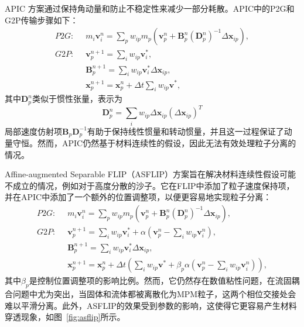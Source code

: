 APIC \cite{jiang2015affine}方案通过保持角动量和防止不稳定性来减少一部分耗散。APIC中的P2G和G2P传输步骤如下：
\begin{equation}
    \begin{aligned}
    P2G: \;\;    
    &m_i\mathbf{v}_i^n =\sum_{p}w_{ip}m_p(\mathbf{v}_p^n + \mathbf{B}_p^n(\mathbf{D}_p^n)^{-1}\Delta\mathbf{x}_{ip}), \\
    G2P:\;\; & \mathbf{v}_p^{n+1}=\sum_iw_{ip}\mathbf{v}_i^*,\\
    &\mathbf{B}_p^{n+1} = \sum_{i}w_{ip}\mathbf{v}_i^*\Delta\mathbf{x}_{ip},\\
    &\mathbf{x}_p^{n+1}=\mathbf{x}_p^n+\Delta t\sum_iw_{ip}\mathbf{v^*},
    \end{aligned}
\end{equation}
其中$\mathbf{D}_p^n$类似于惯性张量，表示为
\begin{equation}
    \mathbf{D}_p^n=\sum_{i}w_{ip}\Delta\mathbf{x}_{ip}(\Delta\mathbf{x}_{ip})^T
\end{equation}
局部速度仿射项$\mathbf{B}_p\mathbf{D}_p^{-1}$有助于保持线性惯量和转动惯量，并且这一过程保证了动量守恒。然而，APIC仍然基于材料连续性的假设，因此无法有效处理粒子分离的情况。

Affine-augmented Separable FLIP（ASFLIP）方案\cite{fei2021revisiting}旨在解决材料连续性假设可能不成立的情况，例如对于高度分散的沙子。它在FLIP中添加了粒子速度保持项，并在APIC中添加了一个额外的位置调整项，以便更容易地实现粒子分离：
\begin{equation}
    \begin{aligned}
    P2G: \;\;    
    &m_i\mathbf{v}_i^n =\sum_{p}w_{ip}m_p(\mathbf{v}_p^n + \mathbf{B}_p^n(\mathbf{D}_p^n)^{-1}\Delta\mathbf{x}_{ip}), \\
    G2P:\;\; & \mathbf{v}_p^{n+1}=\sum_iw_{ip}\mathbf{v}_i^*+ \alpha(\mathbf{v}_p^n-\sum_iw_{ip}\mathbf{v}_i^n),\\
    &\mathbf{B}_p^{n+1} = \sum_{i}w_{ip}\mathbf{v}_i^*\Delta\mathbf{x}_{ip},\\
    &\mathbf{x}_p^{n+1}=\mathbf{x}_p^n+\Delta t(\sum_iw_{ip}\mathbf{v^*}+ \beta_p\alpha(\mathbf{v}_p^n-\sum_iw_{ip}\mathbf{v}_i^n)),
    \end{aligned}
\end{equation}
其中$\beta_p$是控制位置调整项的影响比例。然而，它仍然存在数值粘性问题，在流固耦合问题中尤为突出，当固体和流体都被离散化为MPM粒子，这两个相位交接处会难以平滑分离。此外，ASFLIP的效果受到参数的影响，这使得它更容易产生材料穿透现象，如图~\ref{fig:asflip}所示。

